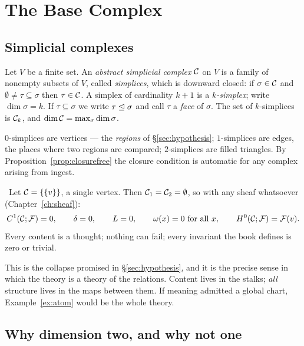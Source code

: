 \chapter{The Base Complex}\label{ch:complex}

\section{Simplicial complexes}

\begin{definition}\label{def:asc}
Let $V$ be a finite set. An \emph{abstract simplicial complex} $\mathcal{C}$ on $V$
is a family of nonempty subsets of $V$, called \emph{simplices}, which is
downward closed: if $\sigma\in\mathcal{C}$ and $\emptyset\neq\tau\subseteq\sigma$
then $\tau\in\mathcal{C}$. A simplex of cardinality $k+1$ is a \emph{$k$-simplex};
write $\dim\sigma=k$. If $\tau\subseteq\sigma$ we write $\tau\trianglelefteq\sigma$
and call $\tau$ a \emph{face} of $\sigma$. The set of $k$-simplices is
$\mathcal{C}_k$, and $\dim\mathcal{C}=\max_\sigma\dim\sigma$.
\end{definition}

$0$-simplices are vertices --- the \emph{regions} of \S\ref{sec:hypothesis};
$1$-simplices are edges, the places where two regions are compared;
$2$-simplices are filled triangles. By Proposition~\ref{prop:closurefree} the
closure condition is automatic for any complex arising from ingest.

\begin{example}\label{ex:atom}
\Proved\ Let $\mathcal{C}=\{\{v\}\}$, a single vertex. Then $\mathcal{C}_1=\mathcal{C}_2=\emptyset$,
so with any sheaf whatsoever (Chapter~\ref{ch:sheaf}):
\[
  C^{1}(\mathcal{C};\mathcal{F})=0,\qquad \delta=0,\qquad L=0,\qquad
  \omega(x)=0 \text{ for all } x,\qquad H^{0}(\mathcal{C};\mathcal{F})=\mathcal{F}(v).
\]
Every content is a thought; nothing can fail; every invariant the book
defines is zero or trivial.
\end{example}

This is the collapse promised in \S\ref{sec:hypothesis}, and it is the precise
sense in which the theory is a theory of the relations. Content lives in the
stalks; \emph{all} structure lives in the maps between them. If meaning
admitted a global chart, Example~\ref{ex:atom} would be the whole theory.

\section{Why dimension two, and why not one}\label{sec:dimtwo}

